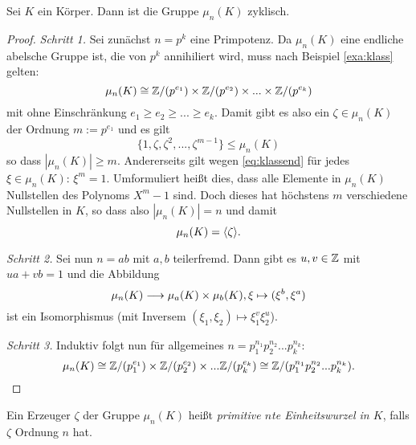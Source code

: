 \documentclass{book}
\begin{document}
\begin{prop}
    \label{prop:ewzyklisch}
    Sei $K$ ein Körper. Dann ist die Gruppe $\mu_n(K)$ zyklisch. 
\end{prop}
\begin{proof}
    
    \emph{Schritt 1.}
    Sei zunächst $n = p^k$ eine Primpotenz. Da $\mu_n(K)$ eine endliche abelsche Gruppe ist, die von $p^k$ annihiliert wird, muss nach Beispiel \ref{exa:klass} gelten:
    \begin{equation}\label{eq:klassend}
            \mu_n(K) \cong \mathbb{Z}/(p^{e_1})  \times \mathbb{Z}/(p^{e_2}) \times ... \times \mathbb{Z}/(p^{e_k})
        \end{equation}
    mit ohne Einschränkung $e_1 \ge e_2 \ge ... \ge e_k$. Damit gibt es also
    ein $\zeta \in \mu_n(K)$ der Ordnung $m := p^{e_1}$ und es gilt
    \[
        \{1, \zeta, \zeta^2, ..., \zeta^{m-1} \} \le \mu_n(K)
    \]
    so dass $|\mu_n(K)| \ge m$. Andererseits gilt wegen \eqref{eq:klassend} für
    jedes $\xi \in \mu_n(K)$: $\xi^m = 1$. Umformuliert heißt dies, dass alle
    Elemente in $\mu_n(K)$ Nullstellen des Polynoms $X^m -1$ sind. Doch dieses hat höchstens $m$ verschiedene Nullstellen in $K$, so dass also $|\mu_n(K)| = n$ und damit
    \[
        \mu_n(K) = \langle \zeta \rangle.
    \]

    \emph{Schritt 2.} Sei nun $n = ab$ mit $a,b$ teilerfremd. Dann gibt es $u,v \in \mathbb{Z}$ mit $ua + v b = 1$ und die Abbildung
    \[
        \mu_n(K) \longrightarrow \mu_a(K) \times \mu_b(K), \xi \mapsto (\xi^b, \xi^a)
    \]
    ist ein Isomorphismus (mit Inversem $(\xi_1, \xi_2) \mapsto \xi_1^v\xi_2^u$). 

    \emph{Schritt 3.} Induktiv folgt nun für allgemeines $n = p_1^{n_1} p_2^{n_2} ... p_k^{n_k}$:
        \[
            \mu_n(K) \cong \mathbb{Z}/(p_1^{e_1}) \times \mathbb{Z}/(p_2^{e_2}) \times ... \mathbb{Z}/(p_k^{e_k}) \cong \mathbb{Z}/(p_1^{n_1} p_2^{n_2} ... p_k^{n_k}).
        \]
\end{proof}

\begin{term}
    \label{term:primew}
    Ein Erzeuger $\zeta$ der Gruppe $\mu_n(K)$ heißt {\em primitive $n$te Einheitswurzel in $K$}, falls $\zeta$ Ordnung $n$ hat. 
\end{term}
\end{document}
